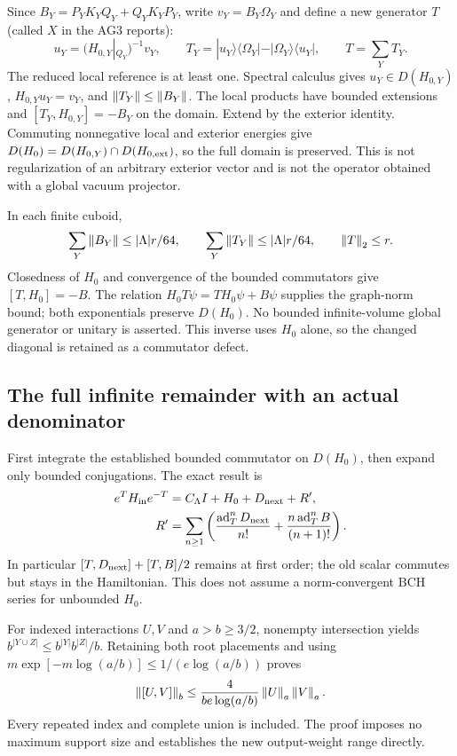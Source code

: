 Since $B_Y=P_YK_YQ_Y+Q_YK_YP_Y$, write $v_Y=B_Y\Omega_Y$ and define a new generator $T$ (called $X$ in the AG3 reports):
\begin{equation}
 u_Y=(H_{0,Y}|_{Q_Y})^{-1}v_Y,\qquad
 T_Y=|u_Y\rangle\langle\Omega_Y|-|\Omega_Y\rangle\langle u_Y|,
 \qquad T=\sum_Y T_Y.
 \label{eq:ag3-generator}
\end{equation}
The reduced local reference is at least one. Spectral calculus gives $u_Y\in D(H_{0,Y})$, $H_{0,Y}u_Y=v_Y$, and $\left\lVert T_Y\right\rVert\le\left\lVert B_Y\right\rVert$. The local products have bounded extensions and $[T_Y,H_{0,Y}]=-B_Y$ on the domain. Extend by the exterior identity. Commuting nonnegative local and exterior energies give $D(H_0)=D(H_{0,Y})\cap D(H_{0,\rm ext})$, so the full domain is preserved. This is not regularization of an arbitrary exterior vector and is not the operator obtained with a global vacuum projector.

In each finite cuboid,
\begin{equation}
 \sum_Y\left\lVert B_Y\right\rVert\le |\Lambda|r/64,\qquad
 \sum_Y\left\lVert T_Y\right\rVert\le |\Lambda|r/64,\qquad \left\lVert T\right\rVert_2\le r.
\end{equation}
Closedness of $H_0$ and convergence of the bounded commutators give $[T,H_0]=-B$. The relation $H_0T\psi=TH_0\psi+B\psi$ supplies the graph-norm bound; both exponentials preserve $D(H_0)$. No bounded infinite-volume global generator or unitary is asserted. This inverse uses $H_0$ alone, so the changed diagonal is retained as a commutator defect.

\subsection{The full infinite remainder with an actual denominator}
First integrate the established bounded commutator on $D(H_0)$, then expand only bounded conjugations. The exact result is
\begin{align}
 e^T H_{\rm in}e^{-T}&=C_\Lambda I+H_0+D_{\rm next}+R',\notag\\
 R'&=\sum_{n\ge1}\left(
 \frac{\operatorname{ad}_T^n D_{\rm next}}{n!}
 +\frac{n\operatorname{ad}_T^n B}{(n+1)!}\right).
 \label{eq:ag3-full-tail}
\end{align}
In particular $[T,D_{\rm next}]+[T,B]/2$ remains at first order; the old scalar commutes but stays in the Hamiltonian. This does not assume a norm-convergent BCH series for unbounded $H_0$.

For indexed interactions $U,V$ and $a>b\ge3/2$, nonempty intersection yields $b^{|Y\cup Z|}\le b^{|Y|}b^{|Z|}/b$. Retaining both root placements and using $m\exp[-m\log(a/b)]\le1/(e\log(a/b))$ proves
\begin{equation}
 \left\lVert[U,V]\right\rVert_b\le\frac{4}{be\log(a/b)}\left\lVert U\right\rVert_a\left\lVert V\right\rVert_a.
 \label{eq:ag3-commutator}
\end{equation}
Every repeated index and complete union is included. The proof imposes no maximum support size and establishes the new output-weight range directly.


